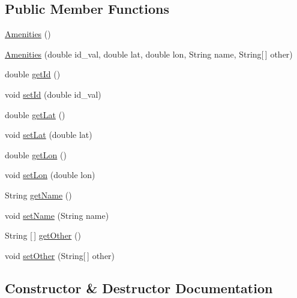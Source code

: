 \subsection*{Public Member Functions}
\begin{DoxyCompactItemize}
\item 
\hyperlink{classbridges_1_1data__src__dependent_1_1_amenities_af8fef61527f05840af07d29b27e7a37b}{Amenities} ()
\item 
\hyperlink{classbridges_1_1data__src__dependent_1_1_amenities_a8f4b8a6f4fb58612e172ad24f4ae3472}{Amenities} (double id\+\_\+val, double lat, double lon, String name, String\mbox{[}$\,$\mbox{]} other)
\item 
double \hyperlink{classbridges_1_1data__src__dependent_1_1_amenities_af92163fb64e2dc067ec0d80c6f659411}{get\+Id} ()
\item 
void \hyperlink{classbridges_1_1data__src__dependent_1_1_amenities_a69649672a786a773e4f271b54fd4aeb5}{set\+Id} (double id\+\_\+val)
\item 
double \hyperlink{classbridges_1_1data__src__dependent_1_1_amenities_ae2cbd635a925de7671d85f279d31c2e6}{get\+Lat} ()
\item 
void \hyperlink{classbridges_1_1data__src__dependent_1_1_amenities_a045f16aeb68af4f58298db858af95083}{set\+Lat} (double lat)
\item 
double \hyperlink{classbridges_1_1data__src__dependent_1_1_amenities_a11396571a86572ec3a988c76711a9eb9}{get\+Lon} ()
\item 
void \hyperlink{classbridges_1_1data__src__dependent_1_1_amenities_abd300182acdf10c9d1d44d18a6661723}{set\+Lon} (double lon)
\item 
String \hyperlink{classbridges_1_1data__src__dependent_1_1_amenities_a0e54ba20eee3569157b6e968c3d6c8f8}{get\+Name} ()
\item 
void \hyperlink{classbridges_1_1data__src__dependent_1_1_amenities_a8149bb449a64db9da1401192905d4a73}{set\+Name} (String name)
\item 
String \mbox{[}$\,$\mbox{]} \hyperlink{classbridges_1_1data__src__dependent_1_1_amenities_a0b80ff1c677e97e6b68483ce4d46a0f6}{get\+Other} ()
\item 
void \hyperlink{classbridges_1_1data__src__dependent_1_1_amenities_ac2ad154f3864a4dc43f712c9b2a1588a}{set\+Other} (String\mbox{[}$\,$\mbox{]} other)
\end{DoxyCompactItemize}


\subsection{Constructor \& Destructor Documentation}
\mbox{\label{classbridges_1_1data__src__dependent_1_1_amenities_af8fef61527f05840af07d29b27e7a37b}} 
